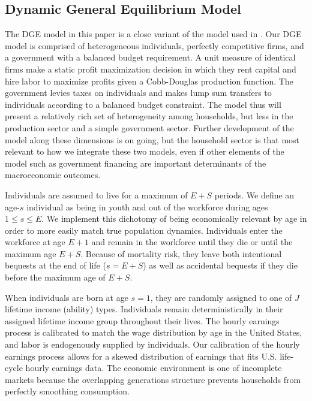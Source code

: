 \documentclass[letterpaper,12pt]{article}
\theoremstyle{definition}
\begin{document}
\begin{spacing}{1.5}
\section{Dynamic General Equilibrium Model}\label{SecDGE}

  The DGE model in this paper is a close variant of the model used in \citet{DEMPRW2015}. Our DGE model is comprised of heterogeneous individuals, perfectly competitive firms, and a government with a balanced budget requirement. A unit measure of identical firms make a static profit maximization decision in which they rent capital and hire labor to maximize profits given a Cobb-Douglas production function. The government levies taxes on individuals and makes lump sum transfers to individuals according to a balanced budget constraint.  The model thus will present a relatively rich set of heterogeneity among households, but less in the production sector and a simple government sector.  Further development of the model along these dimensions is on going, but the household sector is that most relevant to how we integrate these two models, even if other elements of the model such as government financing are important determinants of the macroeconomic outcomes.

  Individuals are assumed to live for a maximum of $E+S$ periods. We define an age-$s$ individual as being in youth and out of the workforce during ages $1\leq s\leq E$. We implement this dichotomy of being economically relevant by age in order to more easily match true population dynamics. Individuals enter the workforce at age $E+1$ and remain in the workforce until they die or until the maximum age $E+S$. Because of mortality risk, they leave both intentional bequests at the end of life ($s=E+S$) as well as accidental bequests if they die before the maximum age of $E+S$.

  When individuals are born at age $s=1$, they are randomly assigned to one of $J$ lifetime income (ability) types. Individuals remain deterministically in their assigned lifetime income group throughout their lives. The hourly earnings process is calibrated to match the wage distribution by age in the United States, and labor is endogenously supplied by individuals. Our calibration of the hourly earnings process allows for a skewed distribution of earnings that fits U.S. life-cycle hourly earnings data. The economic environment is one of incomplete markets because the overlapping generations structure prevents households from perfectly smoothing consumption.


\end{spacing}
\end{document}
